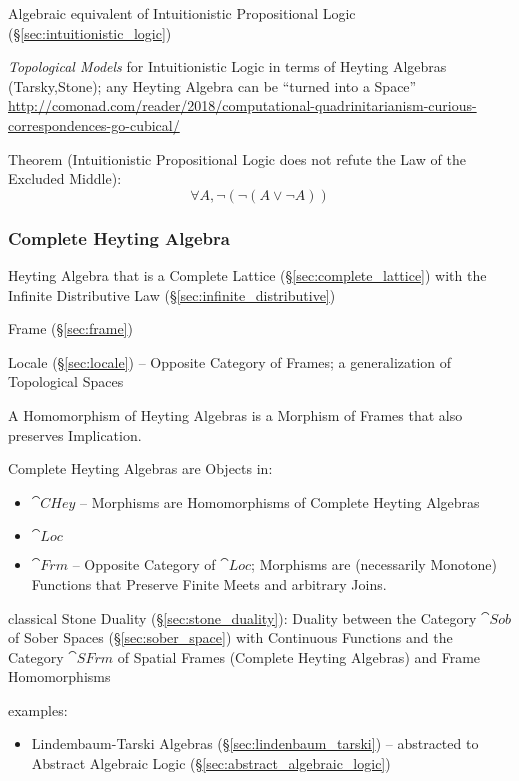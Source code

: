 Algebraic equivalent of Intuitionistic Propositional Logic
(\S\ref{sec:intuitionistic_logic})

\emph{Topological Models} for Intuitionistic Logic in terms of Heyting Algebras
(Tarsky,Stone); any Heyting Algebra can be ``turned into a Space''
\url{http://comonad.com/reader/2018/computational-quadrinitarianism-curious-correspondences-go-cubical/}

Theorem (Intuitionistic Propositional Logic does not refute the Law of
the Excluded Middle)\cite{harper12}:
\[
  \forall A, \neg (\neg (A \vee \neg A))
\]



\subsubsection{Complete Heyting Algebra}\label{sec:complete_heyting_algebra}

Heyting Algebra that is a Complete Lattice
(\S\ref{sec:complete_lattice}) with the Infinite Distributive Law
(\S\ref{sec:infinite_distributive})

Frame (\S\ref{sec:frame})

Locale (\S\ref{sec:locale}) -- Opposite Category of Frames; a generalization of
Topological Spaces

A Homomorphism of Heyting Algebras is a Morphism of Frames that also
preserves Implication.

Complete Heyting Algebras are Objects in:
\begin{itemize}
  \item $\cat{CHey}$ -- Morphisms are Homomorphisms of Complete
    Heyting Algebras
  \item $\cat{Loc}$
  \item $\cat{Frm}$ -- Opposite Category of $\cat{Loc}$; Morphisms are
    (necessarily Monotone) Functions that Preserve Finite Meets and
    arbitrary Joins.
\end{itemize}

classical Stone Duality (\S\ref{sec:stone_duality}): Duality between the
Category $\cat{Sob}$ of Sober Spaces (\S\ref{sec:sober_space}) with Continuous
Functions and the Category $\cat{SFrm}$ of Spatial Frames (Complete Heyting
Algebras) and Frame Homomorphisms

examples:
\begin{itemize}
  \item Lindembaum-Tarski Algebras (\S\ref{sec:lindenbaum_tarski}) -- abstracted
    to Abstract Algebraic Logic (\S\ref{sec:abstract_algebraic_logic})
\end{itemize}



